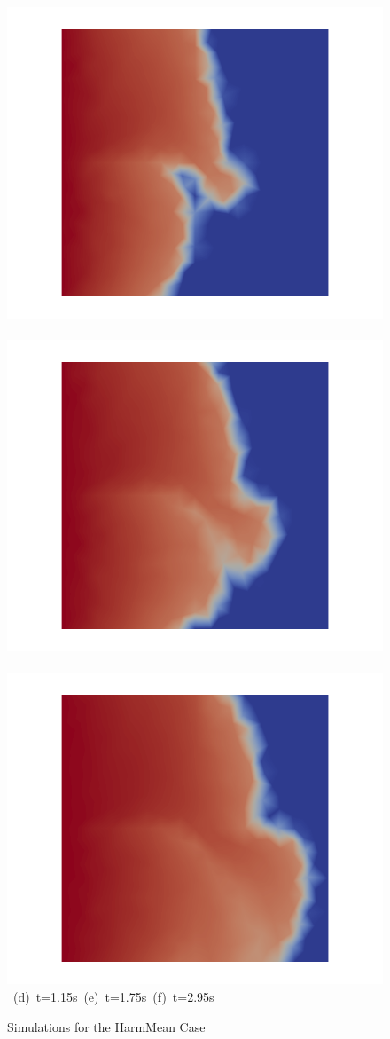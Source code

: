 \begin{landscape}
\begin{figure}[ht]
{\vspace{0.5cm}
\hbox{
      \includegraphics[width=.56\textwidth]{./Pics/HarmMeanCase/HarmMeanCase_Saturation_t_1dot15.png}
      \includegraphics[width=.56\textwidth]{./Pics/HarmMeanCase/HarmMeanCase_Saturation_t_1dot75.png} 
      \includegraphics[width=.56\textwidth]{./Pics/HarmMeanCase/HarmMeanCase_Saturation_t_2dot95.png}}
\vspace{0.cm}
\hbox{ \hspace{2.5cm} (d) t=1.15s \hspace{5.5cm} (e) t=1.75s   \hspace{5.5cm} (f) t=2.95s}
\vspace{0.cm}
}   
\caption{Simulations for the HarmMean Case}
\label{fig:HarmMeanCase_Saturation}
\end{figure}
\end{landscape}
\clearpage






